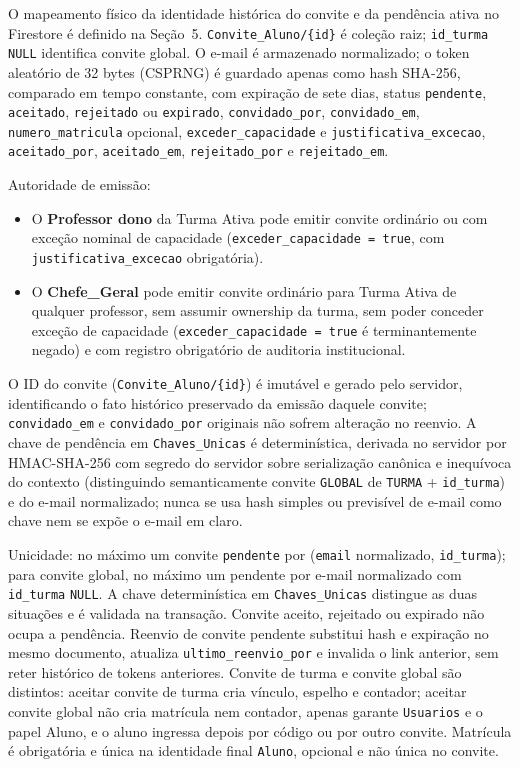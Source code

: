 \begin{regra}
O mapeamento físico da identidade histórica do convite e da pendência ativa no Firestore é definido na Seção~5.
\texttt{Convite\_Aluno/\{id\}} é coleção raiz; \texttt{id\_turma} \texttt{NULL}
identifica convite global. O e-mail é armazenado normalizado; o token aleatório
de 32 bytes (CSPRNG) é guardado apenas como hash SHA-256, comparado em tempo
constante, com expiração de sete dias, status \texttt{pendente}, \texttt{aceitado},
\texttt{rejeitado} ou \texttt{expirado}, \texttt{convidado\_por}, \texttt{convidado\_em},
\texttt{numero\_matricula} opcional, \texttt{exceder\_capacidade} e
\texttt{justificativa\_excecao}, \texttt{aceitado\_por}, \texttt{aceitado\_em},
\texttt{rejeitado\_por} e \texttt{rejeitado\_em}.

Autoridade de emissão:
\begin{itemize}
  \item O \textbf{Professor dono} da Turma Ativa pode emitir convite ordinário ou com exceção nominal de capacidade (\texttt{exceder\_capacidade = true}, com \texttt{justificativa\_excecao} obrigatória).
  \item O \textbf{Chefe\_Geral} pode emitir convite ordinário para Turma Ativa de qualquer professor, sem assumir ownership da turma, sem poder conceder exceção de capacidade (\texttt{exceder\_capacidade = true} é terminantemente negado) e com registro obrigatório de auditoria institucional.
\end{itemize}

O ID do convite (\texttt{Convite\_Aluno/\{id\}}) é imutável e gerado pelo servidor,
identificando o fato histórico preservado da emissão daquele convite; \texttt{convidado\_em}
e \texttt{convidado\_por} originais não sofrem alteração no reenvio. A chave de
pendência em \texttt{Chaves\_Unicas} é determinística, derivada no servidor por HMAC-SHA-256
com segredo do servidor sobre serialização canônica e inequívoca do contexto (distinguindo
semanticamente convite \texttt{GLOBAL} de \texttt{TURMA} + \texttt{id\_turma}) e do e-mail
normalizado; nunca se usa hash simples ou previsível de e-mail como chave nem se expõe o e-mail em claro.

Unicidade: no máximo um convite \texttt{pendente} por
(\texttt{email} normalizado, \texttt{id\_turma}); para convite global, no
máximo um pendente por e-mail normalizado com \texttt{id\_turma} \texttt{NULL}.
A chave determinística em \texttt{Chaves\_Unicas} distingue as duas situações e
é validada na transação. Convite aceito, rejeitado ou expirado não ocupa a pendência.
Reenvio de convite pendente substitui hash e expiração no mesmo documento, atualiza
\texttt{ultimo\_reenvio\_por} e invalida o link anterior, sem reter histórico de tokens
anteriores. Convite de turma e convite global são distintos: aceitar convite de
turma cria vínculo, espelho e contador; aceitar convite global não cria
matrícula nem contador, apenas garante \texttt{Usuarios} e o papel Aluno, e o
aluno ingressa depois por código ou por outro convite. Matrícula é obrigatória
e única na identidade final \texttt{Aluno}, opcional e não única no convite.


\end{regra}

